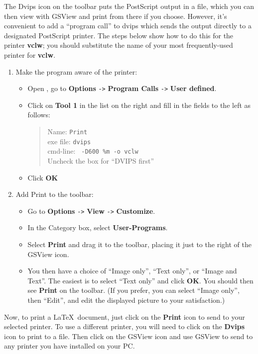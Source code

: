 \documentclass{article}
\begin{document}
The Dvips icon on the  toolbar puts the PostScript output in a file,
which you can then view with GSView and print from there if you choose.
However, it's convenient to add a  ``program call'' to dvips which
sends the output directly to a designated PostScript printer. The steps
below show how to do this for the printer \textbf{vclw}; you should
substitute the name of your most frequently-used printer for \textbf{vclw}.
\begin{enumerate}
\item Make the program aware of the printer:
\begin{itemize}

\item Open , go to \textbf{Options} \verb+->+ 
\textbf{Program Calls} \verb+->+ \textbf{User defined}.

\item Click on \textbf{Tool 1} in the list on the right and fill in the 
fields to the left as follows:\vspace{-6pt}
\begin{quote}
Name: \verb+Print+\\
exe file: \verb+dvips+\\
cmd-line: \verb+ -D600 %m -o vclw+\\
Uncheck the box for ``DVIPS first''
\end{quote}%
\item Click \textbf{OK}
\end{itemize}
\item Add Print to the toolbar:
\begin{itemize}
\item Go to  \textbf{Options} \verb+->+ \textbf{View} \verb+->+ \textbf{Customize}.
\item In the Category box, select \textbf{User-Programs}.
\item Select \textbf{Print} and drag it to the toolbar, placing it just to
  the right of the GSView icon.
\item You then have a choice of ``Image only'', ``Text only'', or ``Image and
Text''. The easiest is to select ``Text only'' and click \textbf{OK}.
You should then see \textbf{Print} on the toolbar. (If you prefer, you can
select ``Image only'', then ``Edit'', and edit the displayed picture to your
satisfaction.)
\end{itemize}
\end{enumerate}
Now, to print a \LaTeX\ document, just click on the \textbf{Print} icon to
send to your selected printer. To use a different printer, you will need to
click on the \textbf{Dvips} icon to print to a file. Then click on the
GSView icon and use GSView to send to any printer you have installed on
your PC.
\end{document}
